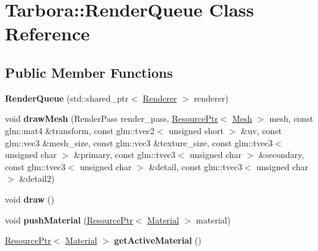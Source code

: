 \hypertarget{classTarbora_1_1RenderQueue}{}\section{Tarbora\+:\+:Render\+Queue Class Reference}
\label{classTarbora_1_1RenderQueue}
\subsection*{Public Member Functions}
\begin{DoxyCompactItemize}
\item 
\mbox{\label{classTarbora_1_1RenderQueue_af7c03190dc5846f4859662238535f3f9}} 
{\bfseries Render\+Queue} (std\+::shared\+\_\+ptr$<$ \hyperlink{classTarbora_1_1Renderer}{Renderer} $>$ renderer)
\item 
\mbox{\label{classTarbora_1_1RenderQueue_a5e2a17364f5676c7f192a3a6f3fd3891}} 
void {\bfseries draw\+Mesh} (Render\+Pass render\+\_\+pass, \hyperlink{classTarbora_1_1ResourcePtr}{Resource\+Ptr}$<$ \hyperlink{classTarbora_1_1Mesh}{Mesh} $>$ mesh, const glm\+::mat4 \&transform, const glm\+::tvec2$<$ unsigned short $>$ \&uv, const glm\+::vec3 \&mesh\+\_\+size, const glm\+::vec3 \&texture\+\_\+size, const glm\+::tvec3$<$ unsigned char $>$ \&primary, const glm\+::tvec3$<$ unsigned char $>$ \&secondary, const glm\+::tvec3$<$ unsigned char $>$ \&detail, const glm\+::tvec3$<$ unsigned char $>$ \&detail2)
\item 
\mbox{\label{classTarbora_1_1RenderQueue_a04c3d762239288fa41881011fca4844f}} 
void {\bfseries draw} ()
\item 
\mbox{\label{classTarbora_1_1RenderQueue_aaa8306d72b9805e0fd8b050c8200970d}} 
void {\bfseries push\+Material} (\hyperlink{classTarbora_1_1ResourcePtr}{Resource\+Ptr}$<$ \hyperlink{classTarbora_1_1Material}{Material} $>$ material)
\item 
\mbox{\label{classTarbora_1_1RenderQueue_ab62a6bff424b7f44a20319197579a4d1}} 
\hyperlink{classTarbora_1_1ResourcePtr}{Resource\+Ptr}$<$ \hyperlink{classTarbora_1_1Material}{Material} $>$ {\bfseries get\+Active\+Material} ()
\item 

\end{DoxyCompactItemize}
